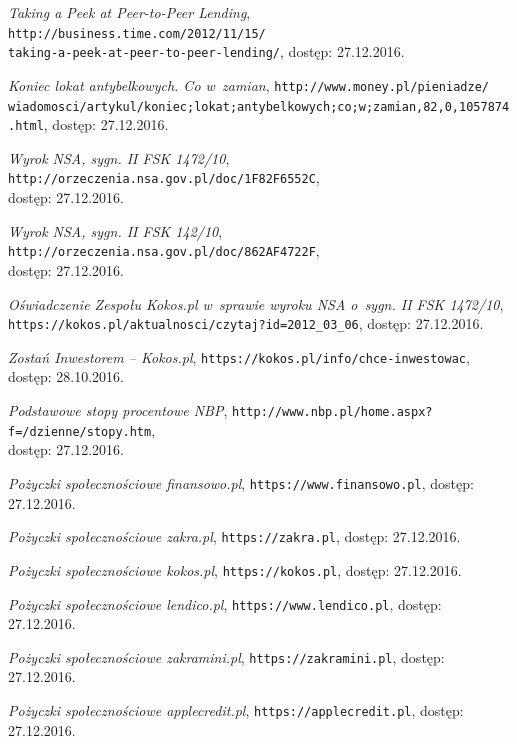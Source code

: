 \documentclass[a4paper,twoside,titlepage,openright]{book}
\begin{document}
\begin{thebibliography}{99}
 \textit{Taking a Peek at Peer-to-Peer Lending}, 
\texttt{http://business.time.com/2012/11/15/\\taking-a-peek-at-peer-to-peer-lending/}, dostęp: 27.12.2016.

 \textit{Koniec lokat antybelkowych. Co w~zamian}, 
\texttt{http://www.money.pl/pieniadze/\\wiadomosci/artykul/koniec;lokat;antybelkowych;co;w;zamian,82,0,1057874.html}, dostęp: 27.12.2016.

 \textit{Wyrok NSA, sygn. II FSK 1472/10}, \texttt{http://orzeczenia.nsa.gov.pl/doc/1F82F6552C}, \\dostęp: 27.12.2016.

 \textit{Wyrok NSA, sygn. II FSK 142/10}, 
\texttt{http://orzeczenia.nsa.gov.pl/doc/862AF4722F}, \\dostęp: 27.12.2016.

 \textit{Oświadczenie Zespołu Kokos.pl w~sprawie wyroku NSA o~sygn. II FSK 1472/10}, \\
\texttt{https://kokos.pl/aktualnosci/czytaj?id=2012\_03\_06}, dostęp: 27.12.2016.

 \textit{Zostań Inwestorem -- Kokos.pl}, 
\texttt{https://kokos.pl/info/chce-inwestowac}, \\dostęp: 28.10.2016.

 \textit{Podstawowe stopy procentowe NBP}, 
\texttt{http://www.nbp.pl/home.aspx?f=/dzienne/stopy.htm}, \\dostęp: 27.12.2016.

 \textit{Pożyczki społecznościowe finansowo.pl}, 
\texttt{https://www.finansowo.pl}, dostęp: 27.12.2016.

 \textit{Pożyczki społecznościowe zakra.pl}, 
\texttt{https://zakra.pl}, dostęp: 27.12.2016.

 \textit{Pożyczki społecznościowe kokos.pl}, 
\texttt{https://kokos.pl}, dostęp: 27.12.2016.

 \textit{Pożyczki społecznościowe lendico.pl}, 
\texttt{https://www.lendico.pl}, dostęp: 27.12.2016.

 \textit{Pożyczki społecznościowe zakramini.pl}, 
\texttt{https://zakramini.pl}, dostęp: 27.12.2016.

 \textit{Pożyczki społecznościowe applecredit.pl}, 
\texttt{https://applecredit.pl}, dostęp: 27.12.2016.


\end{thebibliography}
\end{document}

